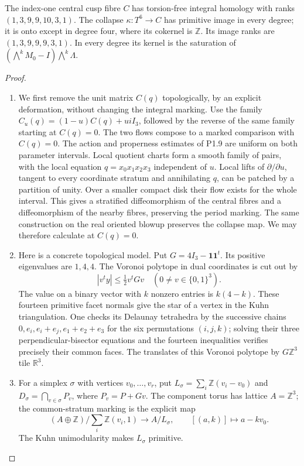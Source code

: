\begin{theorem}\label{night:P1.11}
The index-one central cusp fibre $C$ has torsion-free integral homology
with ranks $(1,3,9,9,10,3,1)$.
The collapse $\kappa:T^6\to C$ has primitive image in every degree;
it is onto except in degree four, where its cokernel is $\mathbb Z$.
Its image ranks are $(1,3,9,9,9,3,1)$.
In every degree its kernel is the saturation of
$(\bigwedge^kM_0-I)\bigwedge^k\Lambda$.
\end{theorem}
\begin{proof}
\begin{enumerate}[label=\arabic*.]
\item We first remove the unit matrix $C(q)$ topologically, by an explicit
deformation, without changing the integral marking.  Use the family
$C_u(q)=(1-u)C(q)+u iI_3$, followed by the reverse of the same
family starting at $C(q)=0$.  The two flows compose to a marked
comparison with $C(q)=0$.  The action and properness estimates
of P1.9 are uniform on both parameter intervals.  Local quotient charts form a smooth
family of pairs, with the local equation $q=x_0x_1x_2x_3$ independent
of $u$.  Local lifts of $\partial/\partial u$, tangent to every
coordinate stratum and annihilating $q$, can be patched by a partition
of unity.  Over a smaller compact disk their flow exists for the whole
interval.  This gives a stratified diffeomorphism of the central
fibres and a diffeomorphism of the nearby fibres, preserving the
period marking.  The same construction on the real oriented blowup
preserves the collapse map.  We may therefore calculate at $C(q)=0$.

\item Here is a concrete topological model.  Put $G=4I_3-\mathbf1\mathbf1^t$.
Its positive eigenvalues are $1,4,4$.  The Voronoi polytope in dual
coordinates is cut out by
\[
|v^ty|\leq \tfrac12v^tGv
 \quad (0\ne v\in\{0,1\}^3).
\]
The value on a binary vector with $k$ nonzero entries is $k(4-k)$.
These fourteen primitive facet normals give the star of a vertex in
the Kuhn triangulation.  One checks its Delaunay tetrahedra by the
successive chains
$0,e_i,e_i+e_j,e_1+e_2+e_3$ for the six permutations $(i,j,k)$;
solving their three perpendicular-bisector equations and the fourteen
inequalities verifies precisely their common faces.  The translates
of this Voronoi polytope by $G\mathbb Z^3$ tile $\mathbb R^3$.

\item For a simplex $\sigma$ with vertices $v_0,\ldots,v_r$, put
$L_\sigma=\sum_i\mathbb Z(v_i-v_0)$ and
$D_\sigma=\bigcap_{v\in\sigma}P_v$, where $P_v=P+Gv$.
The component torus has lattice $A=\mathbb Z^3$; the common-stratum
marking is the explicit map
\[
 (A\oplus\mathbb Z)/\sum_i\mathbb Z(v_i,1)
 \longrightarrow A/L_\sigma,\qquad
 [(a,k)]\longmapsto a-kv_0.
\]
The Kuhn unimodularity makes $L_\sigma$ primitive.


\end{enumerate}
\end{proof}
